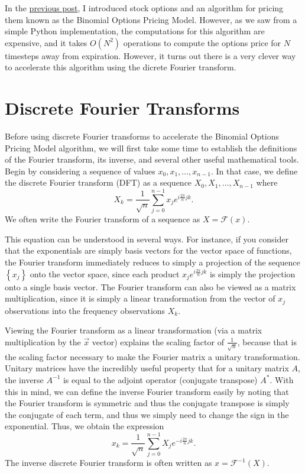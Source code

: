 \documentclass[11pt]{article}
\newcommand\nicefrac[2]{\frac{#1}{#2}}
\newcommand\set[1]{\left\{#1\right\}}
\begin{document}
In the \href{http://andrew.gibiansky.com/blog/economics/binomial-options-pricing-model}{previous post}, I
introduced stock options and an algorithm for pricing them known as the
Binomial Options Pricing Model. However, as we saw from a simple Python
implementation, the computations for this algorithm are expensive, and it takes
$O(N^2)$ operations to compute the options price for $N$ timesteps away from
expiration. However, it turns out there is a very clever way to accelerate this
algorithm using the dicrete Fourier transform.

\section*{Discrete Fourier Transforms}
Before using discrete Fourier transforms to accelerate the Binomial Options Pricing Model algorithm,
we will first take some time to establish the definitions of the Fourier transform, its inverse, and
several other useful mathematical tools. Begin by considering a sequence of values $x_0, x_1,
\ldots, x_{n-1}$. In that case, we define the discrete Fourier transform (DFT) as a sequence $X_0, X_1,
\ldots, X_{n-1}$ where
\[X_k = \frac{1}{\sqrt{n}} \sum_{j=0}^{n-1} x_j e^{i\frac{2\pi}{n} jk}.\]
We often write the Fourier transform of a sequence as $X = \mathcal{F}(x)$. 

This equation can be understood in several ways. For instance, if you consider that the exponentials
are simply basis vectors for the vector space of functions, the Fourier transform immediately
reduces to simply a projection of the sequence $\set{x_j}$ onto the vector space, since each product
$x_j e^{i\frac{2\pi}{n} jk}$ is simply the projection onto a single basis vector. The Fourier
transform can also be viewed as a matrix multiplication, since it is simply a linear transformation
from the vector of $x_j$ observations into the frequency observations $X_k$. 

Viewing the Fourier transform as a linear transformation (via a matrix multiplication by the $\vec
x$ vector) explains the scaling factor of $\nicefrac{1}{\sqrt{n}}$, because that is the scaling
factor necessary to make the Fourier matrix a unitary transformation. Unitary matrices have the
incredibly useful property that for a unitary matrix $A$, the inverse $A^{-1}$ is equal to the
adjoint operator (conjugate transpose) $A^*$. With this in mind, we can define the inverse Fourier
transform easily by noting that the Fourier transform is symmetric and thus the conjugate transpose
is simply the conjugate of each term, and thus we simply need to change the sign in the exponential.
Thus, we obtain the expression
\[x_k = \frac{1}{\sqrt{n}} \sum_{j=0}^{n-1} X_j e^{-i\frac{2\pi}{n} jk}.\]
The inverse discrete Fourier transform is often written as $x = \mathcal{F}^{-1}(X)$.
\end{document}
